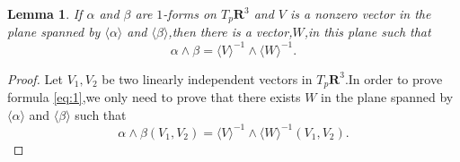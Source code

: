 \documentclass{article}
\newtheorem*{lem}{Lemma}
\newenvironment{lemma}
{\bigskip\begin{mdframed}\begin{lem}}
    {\end{lem}\end{mdframed}\bigskip}
\begin{document}
\begin{lemma}
If $\alpha$ and $\beta$ are $1$-forms on $T_p\mathbf{R}^3$ and $V$ is
a nonzero vector in the plane spanned by $\langle \alpha\rangle$ and
$\langle \beta\rangle$,then there is a vector,$W$,in this plane such
that 
\begin{equation}\label{eq:1}
\alpha\wedge \beta=\langle V\rangle^{-1}\wedge \langle W\rangle ^{-1}.
\end{equation}
\end{lemma}
\begin{proof}
Let $V_1,V_2$ be two linearly independent vectors in
$T_p\mathbf{R}^3$.In order to prove formula \eqref{eq:1},we only need
to prove that there exists $W$ in the plane spanned by $\langle
\alpha\rangle$ and $\langle\beta\rangle$ such that
$$
\alpha\wedge \beta(V_1,V_2)=\langle V\rangle^{-1}\wedge \langle W\rangle ^{-1}(V_1,V_2).
$$

\end{proof}
\end{document}
